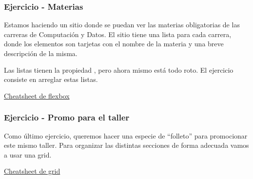 \begin{frame}
    \frametitle{Ejercicio - Materias}
    
    Estamos haciendo un sitio donde se puedan ver las materias obligatorias de las carreras de 
    Computación y Datos. El sitio tiene una lista para cada carrera, donde los elementos son 
    tarjetas con el nombre de la materia y una breve descripción de la misma.

    Las listas tienen la propiedad , pero ahora mismo está todo roto.
    El ejercicio consiste en arreglar estas listas.

    \href{https://flexbox.malven.co/}{Cheatsheet de flexbox}

\end{frame}

\begin{frame}
    \frametitle{Ejercicio - Promo para el taller}

    Como último ejercicio, queremos hacer una especie de ``folleto'' para promocionar este 
    mismo taller. Para organizar las distintas secciones de forma adecuada vamos a usar 
    una grid.

    \href{https://grid.malven.co/}{Cheatsheet de grid}

\end{frame}